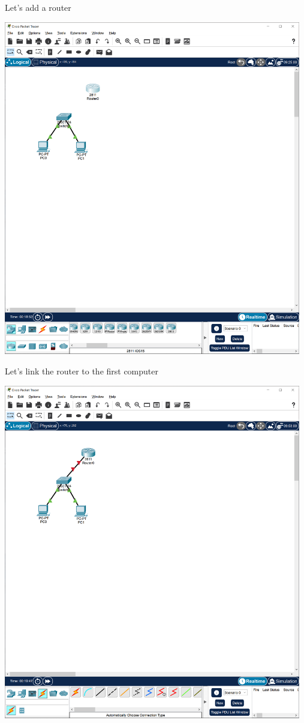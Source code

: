 \documentclass[a4paper,12pt]{book}
\begin{document}
\noindent Let's add a router \newline

\noindent \includegraphics[width=13cm]{./step-by-step/11.PNG}
\clearpage

\noindent Let's link the router to the first computer \newline

\noindent \includegraphics[width=13cm]{./step-by-step/12.PNG}
\clearpage
\end{document}
